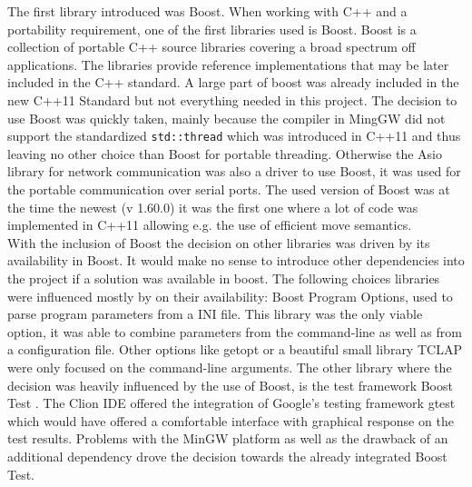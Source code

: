 The first library introduced was Boost. When working with C++ and a portability requirement, one of the first libraries used is Boost. Boost is a collection of portable C++ source libraries covering a broad spectrum off applications. The libraries provide reference implementations that may be later included in the C++ standard. A large part of boost was already included in the new C++11 Standard \cite{cpp_std} but not everything needed in this project. The decision to use Boost was quickly taken, mainly because the compiler in MingGW did not support the standardized \texttt{std::thread} which was introduced in C++11 and thus leaving no other choice than Boost for portable threading. Otherwise the Asio library for network communication was also a driver to use Boost, it was used for the portable communication over serial ports. The used version of Boost was at the time the newest (v 1.60.0) it was the first one where a lot of code was implemented in C++11 allowing e.g. the use of efficient move semantics.\\
With the inclusion of Boost the decision on other libraries was driven by its availability in Boost. It would make no sense to introduce other dependencies into the project if a solution was available in boost. The following choices libraries were influenced mostly by on their availability: Boost Program Options, used to parse program parameters from a INI file. This library was the only viable option, it was able to combine parameters from the command-line as well as from a configuration file. Other options like getopt \cite{getop} or a beautiful small library TCLAP \cite{tclap} were only focused on the command-line arguments. The other library where the decision was heavily influenced by the use of Boost, is the test framework Boost Test \cite{boost_test}. The Clion IDE offered the integration of Google's testing framework gtest \cite{gtest} which would have offered a comfortable interface with graphical response on the test results. Problems with the MinGW platform as well as the drawback of an additional dependency drove the decision towards the already integrated Boost Test.


